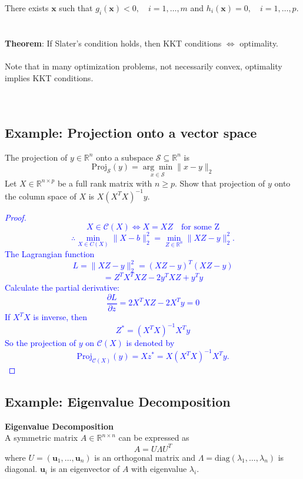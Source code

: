 \documentclass[12pt]{book}
\theoremstyle{definition}
\theoremstyle{remark}
\newcommand{\R}{\mathbb{R}}
\begin{document}
There exists $\mathbf{x}$ such that $g_i(\mathbf{x}) < 0, \quad i = 1, \dots, m$ and $h_i(\mathbf{x}) = 0, \quad i = 1, \dots, p$.\\
\\
\\
\textbf{Theorem}:
If Slater’s condition holds, then KKT conditions $\iff$ optimality.\\
\\
Note that in many optimization problems, not necessarily convex, optimality implies KKT conditions.
\\
\\
\\
\subsection{Example: Projection onto a vector space}
The projection of $y\in\R^n$ onto a subspace $\mathcal{S} \subseteq \R^n$ is 
\[\text{Proj}_{\mathcal{S}}(y) = \underset{x\in \mathcal{S}}{\arg \min}\|x-y\|_2\]
Let $X\in\R^{n\times p}$ be a full rank matrix with $n\ge p$. Show that projection of $y$ onto the column space of $X$ is $X(X^TX)^{-1}y$.

\textcolor{blue}{
\begin{proof}
    \[X\in \mathcal{C}(X) \Leftrightarrow X = XZ\quad \text{for some Z}\]
    \[\therefore \min_{X \in C(X)} \|X - b\|_2^2 = \min_{Z \in \mathbb{R}^n} \|XZ - y\|_2^2.\]
    The Lagrangian function 
    \[L = \|XZ - y\|_2^2 = (XZ - y)^T (XZ - y)\]\[= Z^T X^T XZ - 2 y^T XZ + y^T y\]
    Calculate the partial derivative:
    \[\frac{\partial L}{\partial z} = 2X^T XZ - 2X^T y = 0\]
    If $X^T X$ is inverse, then 
    \[Z^* = (X^T X)^{-1} X^T y\]
    So the projection of $y$ on $\mathcal{C}(X)$ is denoted by
    \[\text{Proj}_{\mathcal{C}(X)}(y) = Xz^* = X (X^T X)^{-1} X^T y.\]
\end{proof}
}



\subsection{Example: Eigenvalue Decomposition}
\begin{notionbox}[Note]
    \textbf{Eigenvalue Decomposition} \\A symmetric matrix \( A \in \mathbb{R}^{n \times n} \) can be expressed as
\[A = U \Lambda U^T\]
where \( U  = (\mathbf{u}_1, \dots, \mathbf{u}_n)\) is an orthogonal matrix and \( \Lambda = \text{diag}(\lambda_1, \dots, \lambda_n) \) is diagonal.
\( \mathbf{u}_i \) is an eigenvector of \( A \) with eigenvalue \( \lambda_i \).
\end{notionbox}
\end{document}
